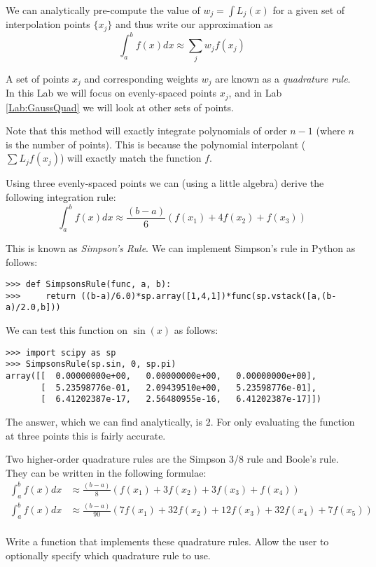 We can analytically pre-compute the value of $w_j = \int L_j(x)$ for a given set of interpolation points $\{x_j\}$ and thus write our approximation as
\[
\int_a^b f(x) dx \approx \sum_j w_j f(x_j)
\]

A set of points $x_j$ and corresponding weights $w_j$ are known as a \emph{quadrature rule}. In this Lab we will focus on evenly-spaced points $x_j$, and in Lab \ref{Lab:GaussQuad} we will look at other sets of points.

Note that this method will exactly integrate polynomials of order $n-1$ (where $n$ is the number of points). This is because the polynomial interpolant ($\sum L_j f(x_j)$) will exactly match the function $f$.

Using three evenly-spaced points we can (using a little algebra) derive the following integration rule:
\[
\int_a^b f(x) dx \approx \frac{(b-a)}{6}\left(f(x_1) + 4 f(x_2) + f(x_3)\right)
\]

This is known as \emph{Simpson's Rule}. We can implement Simpson's rule in Python as follows:
\begin{lstlisting}
>>> def SimpsonsRule(func, a, b):
>>>     return ((b-a)/6.0)*sp.array([1,4,1])*func(sp.vstack([a,(b-a)/2.0,b]))
\end{lstlisting}


We can test this function on $\sin(x)$ as follows:
\begin{lstlisting}
>>> import scipy as sp
>>> SimpsonsRule(sp.sin, 0, sp.pi)
array([[  0.00000000e+00,   0.00000000e+00,   0.00000000e+00],
       [  5.23598776e-01,   2.09439510e+00,   5.23598776e-01],
       [  6.41202387e-17,   2.56480955e-16,   6.41202387e-17]])
\end{lstlisting}


The answer, which we can find analytically, is $2$. For only evaluating the function at three points this is fairly accurate.

\begin{problem}
Two higher-order quadrature rules are the Simpson 3/8 rule and Boole's rule. They can be written in the following formulae:
\begin{align*}
\int_a^b f(x) dx &\approx \frac{(b-a)}{8}\left(f(x_1) + 3 f(x_2) + 3 f(x_3) + f(x_4)\right) \\
\int_a^b f(x) dx &\approx \frac{(b-a)}{90}\left(7f(x_1) + 32 f(x_2) + 12 f(x_3) + 32f(x_4) + 7 f(x_5)\right) \\
\end{align*}

Write a function that implements these quadrature rules. Allow the user to optionally specify which quadrature rule to use.
\end{problem}


